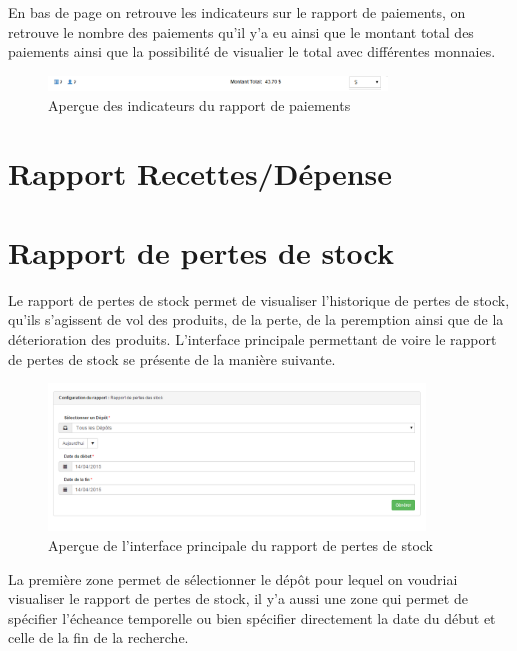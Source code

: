 \documentclass[12pt,a4paper]{report}
\begin{document}
En bas de page on retrouve les indicateurs sur le rapport de paiements, on retrouve le nombre des paiements qu'il y'a eu ainsi que le montant total des paiements ainsi que la possibilité de visualier le total avec différentes monnaies. 

\begin{figure}[h]
\begin{center}
\includegraphics[width=9cm]{pic/IndRapPaiement.png}
\end{center}
\caption{Aperçue des indicateurs du rapport de paiements}
\label{Aperçue des indicateurs du rapport de paiements}
\end{figure}

\newpage
\section{Rapport Recettes/Dépense}

\newpage
\section{Rapport de pertes de stock}
Le rapport de pertes de stock permet de visualiser l'historique de pertes de stock, qu'ils s'agissent de vol des produits, de la perte, de la peremption ainsi que de la déterioration des produits. L'interface principale permettant de voire le rapport de pertes de stock se présente de la manière suivante. 

\begin{figure}[h]
\begin{center}
\includegraphics[width=10cm]{pic/ConfPerStock.png}
\end{center}
\caption{Aperçue de l'interface principale du rapport de pertes de stock}
\label{Aperçue de l'interface principale du rapport de pertes de stock}
\end{figure}


La première zone permet de sélectionner le dépôt pour lequel on voudriai visualiser le rapport de pertes de stock, il y'a aussi une zone qui permet de spécifier l'écheance temporelle  ou bien spécifier directement la date du début et celle de la fin de la recherche. 
\end{document}
